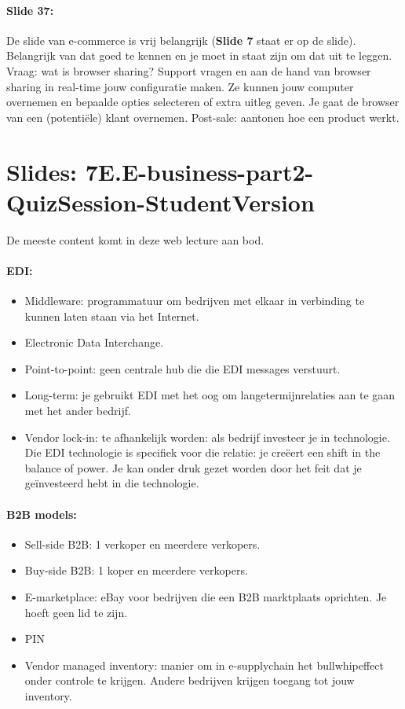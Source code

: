 \documentclass[10pt,a4paper]{report}
\begin{document}
\paragraph{Slide 37:}De slide van e-commerce is vrij belangrijk (\textbf{Slide 7} staat er op de slide). Belangrijk van dat goed te kennen en je moet in staat zijn om dat uit te leggen. Vraag: wat is browser sharing? Support vragen en aan de hand van browser sharing in real-time jouw configuratie maken. Ze kunnen jouw computer overnemen en bepaalde opties selecteren of extra uitleg geven. Je gaat de browser van een (potenti\"ele) klant overnemen. Post-sale: aantonen hoe een product werkt.

\section{Slides: 7E.E-business-part2-QuizSession-StudentVersion}
De meeste content komt in deze web lecture aan bod.

\paragraph{EDI:}
\begin{itemize}
\item Middleware: programmatuur om bedrijven met elkaar in verbinding te kunnen laten staan via het Internet.
\item Electronic Data Interchange.
\item Point-to-point: geen centrale hub die die EDI messages verstuurt. 
\item Long-term: je gebruikt EDI met het oog om langetermijnrelaties aan te gaan met het ander bedrijf.
\item Vendor lock-in: te afhankelijk worden: als bedrijf investeer je in technologie. Die EDI technologie is specifiek voor die relatie: je creëert een shift in the balance of power. Je kan onder druk gezet worden door het feit dat je geïnvesteerd hebt in die technologie. 
\end{itemize}

\paragraph{B2B models:}
\begin{itemize}
\item Sell-side B2B: 1 verkoper en meerdere verkopers.
\item Buy-side B2B: 1 koper en meerdere verkopers.
\item E-marketplace: eBay voor bedrijven die een B2B marktplaats oprichten. Je hoeft geen lid te zijn.
\item PIN
\item Vendor managed inventory: manier om in e-supplychain het bullwhipeffect onder controle te krijgen. Andere bedrijven krijgen toegang tot jouw inventory.
\end{itemize}
\end{document}
